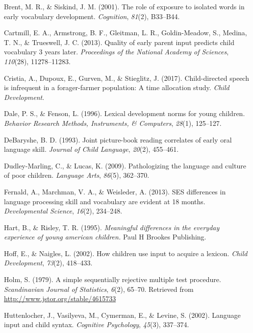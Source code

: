 \documentclass[man]{apa6}
\theoremstyle{definition}
\theoremstyle{definition}
\theoremstyle{definition}
\theoremstyle{remark}
\begin{document}
\hypertarget{ref-brent2001role}{}
Brent, M. R., \& Siskind, J. M. (2001). The role of exposure to isolated
words in early vocabulary development. \emph{Cognition}, \emph{81}(2),
B33--B44.

\hypertarget{ref-cartmill2013quality}{}
Cartmill, E. A., Armstrong, B. F., Gleitman, L. R., Goldin-Meadow, S.,
Medina, T. N., \& Trueswell, J. C. (2013). Quality of early parent input
predicts child vocabulary 3 years later. \emph{Proceedings of the
National Academy of Sciences}, \emph{110}(28), 11278--11283.

\hypertarget{ref-cristia2017child}{}
Cristia, A., Dupoux, E., Gurven, M., \& Stieglitz, J. (2017).
Child-directed speech is infrequent in a forager-farmer population: A
time allocation study. \emph{Child Development}.

\hypertarget{ref-dale1996lexical}{}
Dale, P. S., \& Fenson, L. (1996). Lexical development norms for young
children. \emph{Behavior Research Methods, Instruments, \& Computers},
\emph{28}(1), 125--127.

\hypertarget{ref-debaryshe1993joint}{}
DeBaryshe, B. D. (1993). Joint picture-book reading correlates of early
oral language skill. \emph{Journal of Child Language}, \emph{20}(2),
455--461.

\hypertarget{ref-dudley2009pathologizing}{}
Dudley-Marling, C., \& Lucas, K. (2009). Pathologizing the language and
culture of poor children. \emph{Language Arts}, \emph{86}(5), 362--370.

\hypertarget{ref-fernald2013ses}{}
Fernald, A., Marchman, V. A., \& Weisleder, A. (2013). SES differences
in language processing skill and vocabulary are evident at 18 months.
\emph{Developmental Science}, \emph{16}(2), 234--248.

\hypertarget{ref-hart1995meaningful}{}
Hart, B., \& Risley, T. R. (1995). \emph{Meaningful differences in the
everyday experience of young american children.} Paul H Brookes
Publishing.

\hypertarget{ref-hoff2002children}{}
Hoff, E., \& Naigles, L. (2002). How children use input to acquire a
lexicon. \emph{Child Development}, \emph{73}(2), 418--433.

\hypertarget{ref-holm1979simple}{}
Holm, S. (1979). A simple sequentially rejective multiple test
procedure. \emph{Scandinavian Journal of Statistics}, \emph{6}(2),
65--70. Retrieved from \url{http://www.jstor.org/stable/4615733}

\hypertarget{ref-huttenlocher2002language}{}
Huttenlocher, J., Vasilyeva, M., Cymerman, E., \& Levine, S. (2002).
Language input and child syntax. \emph{Cognitive Psychology},
\emph{45}(3), 337--374.
\end{document}
